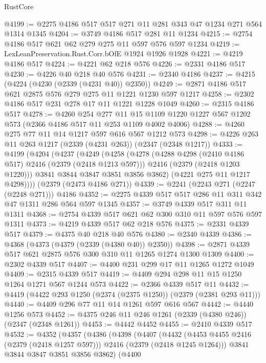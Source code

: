 \begin{lexlean}{RustCore}
\begin{coremodule}
@4199 := @2275 @4186 @517 @517 @271 @11 @281 @343 @47 @1234 @271 @564 @1314 @1345
@4204 := @3749 @4186 @517 @281 @11 @1234
@4215 := @2754 @4186 @517 @621 @62 @279 @275 @11 @597 @576 @597 @1234
@4219 := LexLeanPreservation.Rust.Corr.bOfE @1924 @1926 @1928
@4221 := @4219 @4186 @517
@4224 := @4221 @62 @218 @576
@4226 := @2331 @4186 @517
@4230 := @4226 @40 @218 @40 @576
@4231 := @2340 @4186
@4237 := @4215 (@4224 (@4230 (@2339 (@4231 @40)) @2350))
@4249 := @2871 @4186 @517 @621 @2875 @576 @279 @275 @11 @1221 @1230 @597 @1217
@4258 := @2302 @4186 @517 @231 @278 @17 @11 @1221 @1228 @1049
@4260 := @2315 @4186 @517
@4278 := @4260
    @254
    @277
    @11
    @15
    @1109
    @1220
    @1227
    @567
    @1202
    @573
    (@2366 @4186 @517 @11 @253 @1109 @4002 @4006)
@4288 := @4260 @275 @77 @11 @14 @1217 @597 @616 @567 @1212 @573
@4298 := @4226 @263 @11 @263 @1217 (@2339 (@4231 @263)) (@2347 (@2348 @1217))
@4333 := @4199
    (@4204
      (@4237
        (@4249
          (@4258
            (@4278
              (@4288 @4298 (@2410 @4186 @517) @2416 (@2379 (@2418 @1213 @597)))
              @2416
              (@2379 (@2418 @1203 @1220)))
            @3841
            @3844
            @3847
            @3851
            @3856
            @3862)
          (@4221 @275 @11 @1217 @4298))))
    (@2379 (@2473 @4186 @271))
@4339 := @2241 (@2243 @271 (@2247 (@2248 @271))) @4186
@4352 := @2275 @4339 @517 @517 @286 @11 @311 @342 @47 @1311 @286 @564 @597 @1345
@4357 := @3749 @4339 @517 @311 @11 @1311
@4368 := @2754 @4339 @517 @621 @62 @300 @310 @11 @597 @576 @597 @1311
@4373 := @4219 @4339 @517 @62 @218 @576
@4375 := @2331 @4339 @517
@4379 := @4375 @40 @218 @40 @576
@4380 := @2340 @4339
@4386 := @4368 (@4373 (@4379 (@2339 (@4380 @40)) @2350))
@4398 := @2871 @4339 @517 @621 @2875 @576 @300 @310 @11 @1265 @1274 @1300 @1309
@4400 := @2302 @4339 @517
@4407 := @4400 @231 @299 @17 @11 @1265 @1272 @1049
@4409 := @2315 @4339 @517
@4419 := @4409 @294 @298 @11 @15 @1250 @1264 @1271 @567 @1244 @573
@4422 := @2366 @4339 @517 @11
@4432 := @4419 (@4422 @293 @1250 (@2374 (@2375 @1250)) (@2379 (@2381 @293 @11)))
@4440 := @4409 @296 @77 @11 @14 @1261 @597 @616 @567
@4442 := @4440 @1256 @573
@4452 := @4375 @246 @11 @246 @1261 (@2339 (@4380 @246)) (@2347 (@2348 @1261))
@4453 := @4442 @4452
@4455 := @2410 @4339 @517
@4532 := @4352
    (@4357
      (@4386
        (@4398
          (@4407
            (@4432 (@4453 @4455 @2416 (@2379 (@2418 @1257 @597))) @2416 (@2379 (@2418 @1245 @1264)))
            @3841
            @3844
            @3847
            @3851
            @3856
            @3862)
          (@4400

\end{coremodule}
\end{lexlean}
